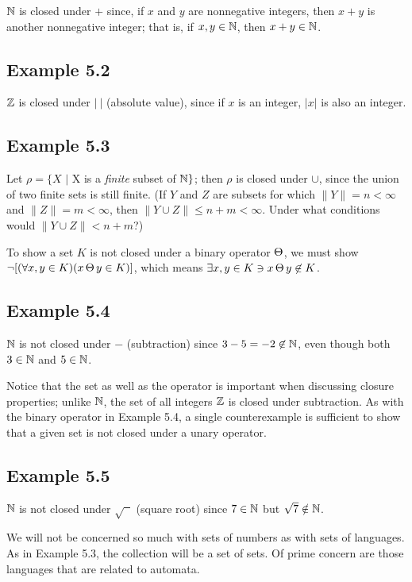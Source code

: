 $\mathbb{N}$ is closed under $+$ since, if $x$ and $y$ are nonnegative integers, then
$x + y$ is another nonnegative integer; that is, if $x,y \in \mathbb{N}$, then
$x + y \in \mathbb{N}$.

\subsection*{Example 5.2}

$\mathbb{Z}$ is closed under $|\ |$ (absolute value), since if $x$ is an integer, $|x|$
is also an integer.

\subsection*{Example 5.3}

Let $\rho =\{X$ $|$ X is a \emph{finite} subset of $\mathbb{N}\}$; then $\rho$ is closed under
$\cup$, since the union of two finite sets is still finite. (If $Y$ and $Z$ are
subsets for which $\|Y\| = n < \infty$ and $\|Z\| = m < \infty$, then
$\|Y \cup Z\| \leq n + m < \infty$. Under what conditions would
$\|Y \cup Z\| < n + m$?)

To show a set $K$ is not closed under a binary operator $\operatorname{\Theta}$, we must show
$\neg[(\forall x,y \in K)(x\operatorname{\Theta} y \in K)]$, which means
$\exists x,y \in K \ni x\operatorname{\Theta} y \not \in K$.

\subsection*{Example 5.4}

$\mathbb{N}$ is not closed under $-$ (subtraction) since $3 - 5 = -2 \not \in \mathbb{N}$, even
though both $3 \in \mathbb{N}$ and $5 \in \mathbb{N}$.

Notice that the set as well as the operator is important when discussing closure
properties; unlike $\mathbb{N}$, the set of all integers $\mathbb{Z}$ is closed under
subtraction. As with the binary operator in Example 5.4, a single counterexample
is sufficient to show that a given set is not closed under a unary operator.

\subsection*{Example 5.5}

$\mathbb{N}$ is not closed under $\sqrt{\phantom{x}}$ (square root) since $7 \in \mathbb{N}$ but
$\sqrt{7} \notin \mathbb{N}$.

We will not be concerned so much with sets of numbers as with sets of languages.
As in Example 5.3, the collection will be a set of sets. Of prime concern are
those languages that are related to automata.


